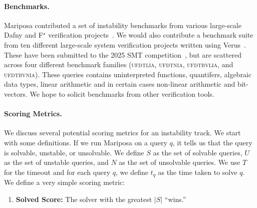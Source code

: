 \documentclass[
]{ceurart}
\newcommand{\fstar}{F${}^\star$\xspace}
\begin{document}
\paragraph{Benchmarks.} Mariposa contributed a set of instability benchmarks
from various large-scale Dafny and \fstar verification projects~\cite{mariposa}. We would
also contribute a benchmark suite from ten different large-scale system
verification projects written using Verus~\cite{verus-ghost}.
These have been submitted to the 2025 SMT competition~\cite{smtcomp2025verus},
but are scattered across four different benchmark families (\textsc{ufdtlia}, \textsc{ufdtnia}, \textsc{ufdtbvlia}, and \textsc{ufdtbvnia}). These queries contains uninterpreted functions, quantifers, algebraic data types, linear arithmetic and in certain cases non-linear arithmetic and bit-vectors. We hope to solicit benchmarks from other verification tools.



\paragraph{Scoring Metrics.} We discuss several potential scoring metrics for an
instability track. We start with some definitions. If we run Mariposa on a query
$q$, it tells us that the query is solvable, unstable, or unsolvable. We define
$S$ as the set of solvable queries, $U$ as the set of unstable queries, and $N$
as the set of unsolvable queries. We use $T$ for the timeout and for each query
$q$, we define $t_q$ as the time taken to solve $q$. We define a very simple
scoring metric:

\begin{enumerate}[label=\Alph*.]
  \item \textbf{Solved Score:} The solver with the greatest $|S|$ ``wins.''
\end{enumerate}
\end{document}
